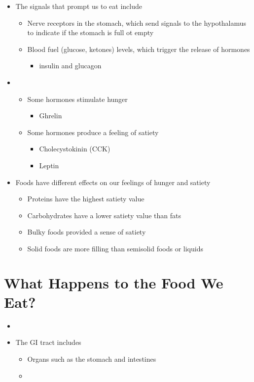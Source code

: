\documentclass[title={Chapter 3}]{fdsn201notes}
\begin{document}
\begin{itemize}
	\item The signals that prompt us to eat include
	\begin{itemize}
		\item Nerve receptors in the stomach, which send signals to the hypothalamus to indicate if the stomach is full ot empty
		\item Blood fuel (glucose, ketones) levels, which trigger the release of hormones
		\begin{itemize}
			\item insulin and glucagon
		\end{itemize}
	\end{itemize}
	\item {}
	\begin{itemize}
		\item Some hormones stimulate hunger
		\begin{itemize}
			\item Ghrelin
		\end{itemize}
		\item Some hormones produce a feeling of satiety
		\begin{itemize}
			\item Cholecystokinin (CCK)
			\item Leptin
		\end{itemize}
	\end{itemize}
	\item Foods have different effects on our feelings of hunger and satiety
	\begin{itemize}
		\item Proteins have the highest satiety value
		\item Carbohydrates have a lower satiety value than fats
		\item Bulky foods provided a sense of satiety
		\item Solid foods are more filling than semisolid foods or liquids
	\end{itemize}
\end{itemize}

\section{What Happens to the Food We Eat?}\label{sec:what-happens-to-the-food-we-eat?}
\begin{itemize}
	\item {}
	\item The GI tract includes
	\begin{itemize}
		\item Organs such as the stomach and intestines
		\item {}
	\end{itemize}
\end{itemize}
\end{document}
